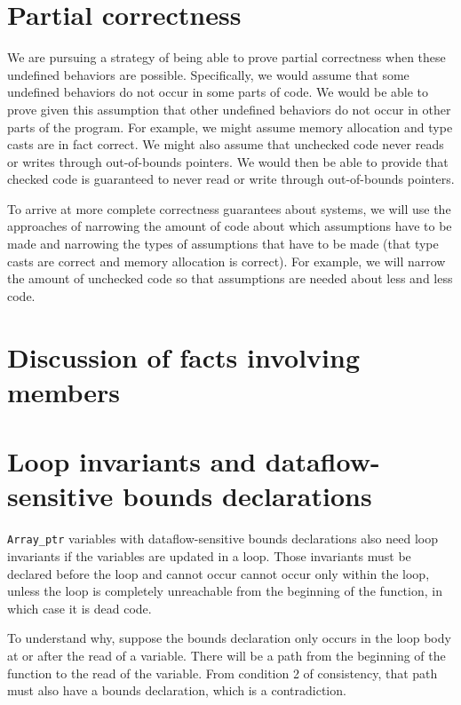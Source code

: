 \section{Partial correctness}

We are pursuing a strategy of being able to prove partial correctness
when these undefined behaviors are possible. Specifically, we would
assume that some undefined behaviors do not occur in some parts of code.
We would be able to prove given this assumption that other undefined
behaviors do not occur in other parts of the program. For example, we
might assume memory allocation and type casts are in fact correct. We
might also assume that unchecked code never reads or writes through
out-of-bounds pointers. We would then be able to provide that checked code
is guaranteed to never read or write through out-of-bounds pointers.

To arrive at more complete correctness guarantees about systems, we will
use the approaches of narrowing the amount of code about which
assumptions have to be made and narrowing the types of assumptions that
have to be made (that type casts are correct and memory allocation is
correct). For example, we will narrow the amount of unchecked code so that
assumptions are needed about less and less code.

\section{Discussion of facts involving members}


\begin{quote}


\end{quote}

\section{Loop invariants and dataflow-sensitive bounds declarations}

\texttt{Array\_ptr} variables with dataflow-sensitive bounds declarations also
need loop invariants if the variables are updated in a loop. Those
invariants must be declared before the loop and cannot occur cannot
occur only within the loop, unless the loop is completely unreachable
from the beginning of the function, in which case it is dead code.

To understand why, suppose the bounds declaration only occurs in the
loop body at or after the read of a variable. There will be a path from
the beginning of the function to the read of the variable. From
condition 2 of consistency, that path must also have a bounds
declaration, which is a contradiction.